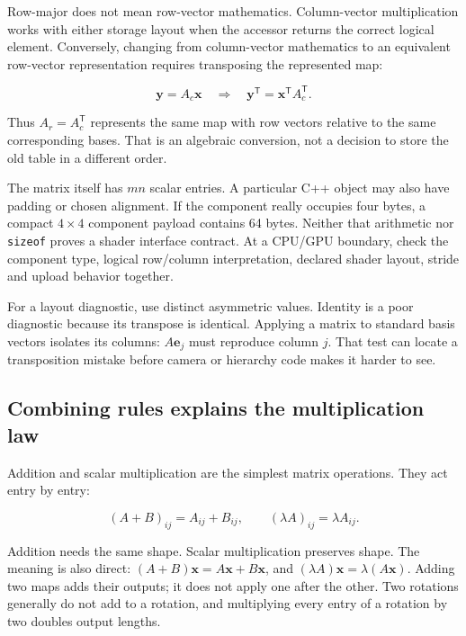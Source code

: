 Row-major does not mean row-vector mathematics. Column-vector multiplication works with either storage layout when the accessor returns the correct logical element. Conversely, changing from column-vector mathematics to an equivalent row-vector representation requires transposing the represented map:

\[
\mathbf y=A_c\mathbf x
\quad\Longrightarrow\quad
\mathbf y^{\mathsf T}=\mathbf x^{\mathsf T}A_c^{\mathsf T}.
\]

Thus \(A_r=A_c^{\mathsf T}\) represents the same map with row vectors relative to the same corresponding bases. That is an algebraic conversion, not a decision to store the old table in a different order.

The matrix itself has \(mn\) scalar entries. A particular C++ object may also have padding or chosen alignment. If the component really occupies four bytes, a compact \(4\times4\) component payload contains 64 bytes. Neither that arithmetic nor \texttt{sizeof} proves a shader interface contract. At a CPU/GPU boundary, check the component type, logical row/column interpretation, declared shader layout, stride and upload behavior together.

For a layout diagnostic, use distinct asymmetric values. Identity is a poor diagnostic because its transpose is identical. Applying a matrix to standard basis vectors isolates its columns: \(A\mathbf e_j\) must reproduce column \(j\). That test can locate a transposition mistake before camera or hierarchy code makes it harder to see.

\subsection{Combining rules explains the multiplication law}\label{01-foundations-i-ch018-combining-rules-explains-the-multiplication-law}

\hypertarget{01-foundations-i-ch018-combining-rules-explains-the-multiplication-law}{}

Addition and scalar multiplication are the simplest matrix operations. They act entry by entry:

\[
(A+B)_{ij}=A_{ij}+B_{ij},\qquad
(\lambda A)_{ij}=\lambda A_{ij}.
\]

Addition needs the same shape. Scalar multiplication preserves shape. The meaning is also direct: \((A+B)\mathbf x=A\mathbf x+B\mathbf x\), and \((\lambda A)\mathbf x=\lambda(A\mathbf x)\). Adding two maps adds their outputs; it does not apply one after the other. Two rotations generally do not add to a rotation, and multiplying every entry of a rotation by two doubles output lengths.

